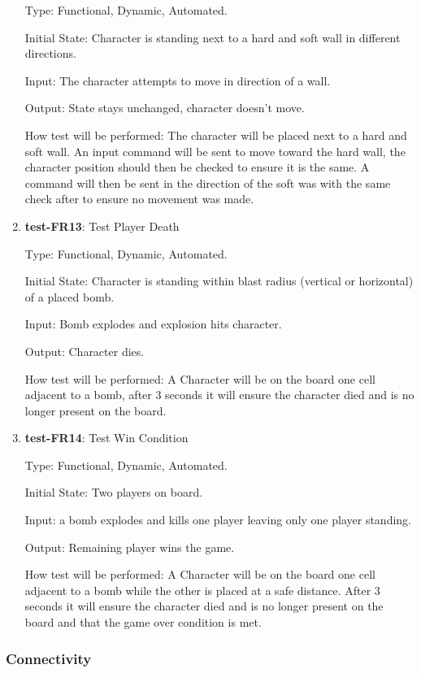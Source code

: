 \documentclass[12pt, titlepage]{article}
\begin{document}
\begin{enumerate}
Type: Functional, Dynamic, Automated.
					
Initial State: Character is standing next to a hard and soft wall in different directions.
					
Input: The character attempts to move in direction of a wall.
					
Output: State stays unchanged, character doesn't move.
					
How test will be performed: The character will be placed next to a hard and soft wall. An input command will be sent to move toward the hard wall, the character position should then be checked to ensure it is the same. A command will then be sent in the direction of the soft was with the same check after to ensure no movement was made.

\item{\textbf{test-FR13}: Test Player Death\\} 

Type: Functional, Dynamic, Automated.
					
Initial State: Character is standing within blast radius (vertical or horizontal) of a placed bomb.
					
Input: Bomb explodes and explosion hits character.
					
Output: Character dies.
					
How test will be performed: A Character will be on the board one cell adjacent to a bomb, after 3 seconds it will ensure the character died and is no longer present on the board.

\item{\textbf{test-FR14}: Test Win Condition\\}

Type: Functional, Dynamic, Automated.
					
Initial State: Two players on board.
					
Input: a bomb explodes and kills one player leaving only one player standing.
					
Output: Remaining player wins the game.
					
How test will be performed: A Character will be on the board one cell adjacent to a bomb while the other is placed at a safe distance. After 3 seconds it will ensure the character died and is no longer present on the board and that the game over condition is met.

\end{enumerate}

\subsubsection{Connectivity}
\end{document}
